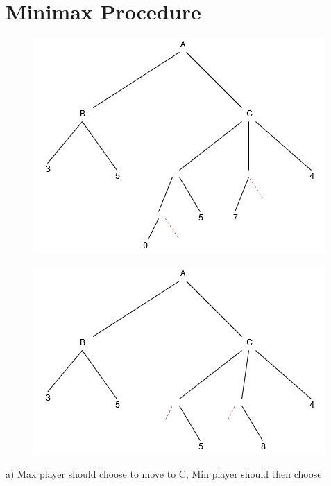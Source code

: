 \documentclass{article}
\begin{document}
\section{Minimax Procedure}
\begin{figure}[H]
\centering
\begin{minipage}{.45\linewidth}
  \includegraphics[width=\linewidth]{images/q7_1.jpg}
  \caption{}
  \label{fig:ex1}
\end{minipage}
\hspace{.05\linewidth}
\begin{minipage}{.45\linewidth}
  \includegraphics[width=\linewidth]{images/q7_2.jpg}
  \label{img2}
\end{minipage}
\end{figure}
a) Max player should choose to move to C, Min player should then choose 
\end{document}
